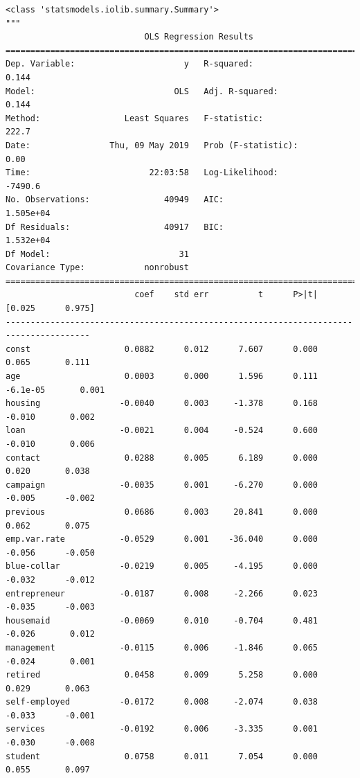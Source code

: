 \documentclass[8pt,onecolumn,aps,pra]{revtex4-1}
\begin{document}
    
    \begin{verbatim}
<class 'statsmodels.iolib.summary.Summary'>
"""
                            OLS Regression Results                            
==============================================================================
Dep. Variable:                      y   R-squared:                       0.144
Model:                            OLS   Adj. R-squared:                  0.144
Method:                 Least Squares   F-statistic:                     222.7
Date:                Thu, 09 May 2019   Prob (F-statistic):               0.00
Time:                        22:03:58   Log-Likelihood:                -7490.6
No. Observations:               40949   AIC:                         1.505e+04
Df Residuals:                   40917   BIC:                         1.532e+04
Df Model:                          31                                         
Covariance Type:            nonrobust                                         
=======================================================================================
                          coef    std err          t      P>|t|      [0.025      0.975]
---------------------------------------------------------------------------------------
const                   0.0882      0.012      7.607      0.000       0.065       0.111
age                     0.0003      0.000      1.596      0.111    -6.1e-05       0.001
housing                -0.0040      0.003     -1.378      0.168      -0.010       0.002
loan                   -0.0021      0.004     -0.524      0.600      -0.010       0.006
contact                 0.0288      0.005      6.189      0.000       0.020       0.038
campaign               -0.0035      0.001     -6.270      0.000      -0.005      -0.002
previous                0.0686      0.003     20.841      0.000       0.062       0.075
emp.var.rate           -0.0529      0.001    -36.040      0.000      -0.056      -0.050
blue-collar            -0.0219      0.005     -4.195      0.000      -0.032      -0.012
entrepreneur           -0.0187      0.008     -2.266      0.023      -0.035      -0.003
housemaid              -0.0069      0.010     -0.704      0.481      -0.026       0.012
management             -0.0115      0.006     -1.846      0.065      -0.024       0.001
retired                 0.0458      0.009      5.258      0.000       0.029       0.063
self-employed          -0.0172      0.008     -2.074      0.038      -0.033      -0.001
services               -0.0192      0.006     -3.335      0.001      -0.030      -0.008
student                 0.0758      0.011      7.054      0.000       0.055       0.097

\end{verbatim}
\end{document}
